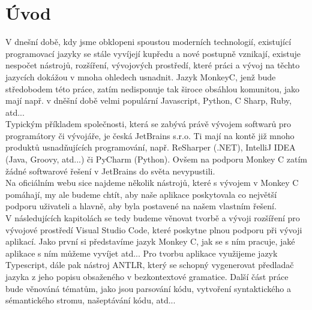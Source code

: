 \chapter{Úvod}
\label{sec:Introduction}
V dnešní době, kdy jsme obklopeni spoustou moderních technologií, existující programovací jazyky se stále vyvíjejí kupředu a nové postupně vznikají, existuje nespočet nástrojů, rozšíření, vývojových prostředí, které práci a vývoj na těchto jazycích dokážou v mnoha ohledech usnadnit. Jazyk MonkeyC, jenž bude středobodem této práce, zatím nedisponuje tak široce obsáhlou komunitou, jako mají např. v dněšní době velmi populární Javascript, Python, C Sharp, Ruby, atd...\\

Typickým příkladem společnosti, která se zabývá právě vývojem softwarů pro programátory či vývojáře, je česká JetBrains s.r.o. Ti mají na kontě již mnoho produktů usnadňujících programování, např. ReSharper (.NET), IntelliJ IDEA (Java, Groovy, atd...) či PyCharm (Python). Ovšem na podporu Monkey C zatím žádné softwarové řešení v JetBrains do světa nevypustili. \cite{jetbrains} \\

Na oficiálním webu \cite{marketplace} sice najdeme několik nástrojů, které s vývojem v Monkey C pomáhají, my ale budeme chtít, aby naše aplikace poskytovala co největší podporu uživateli a hlavně, aby byla postavené na našem vlastním řešení.\\

V následujících kapitolách se tedy budeme věnovat tvorbě a vývoji rozšíření pro vývojové prostředí Visual Studio Code, které poskytne plnou podporu při vývoji aplikací. Jako první si představíme jazyk Monkey C, jak se s ním pracuje, jaké aplikace s ním můžeme vyvíjet atd... Pro tvorbu aplikace využijeme jazyk Typescript, dále pak nástroj ANTLR, který se schopný vygenerovat předladač jazyka z jeho popisu obsaženého v bezkontextové gramatice. Další část práce bude věnováná tématům, jako jsou parsování kódu, vytvoření syntaktického a sémantického stromu, našeptávání kódu, atd...
\endinput
